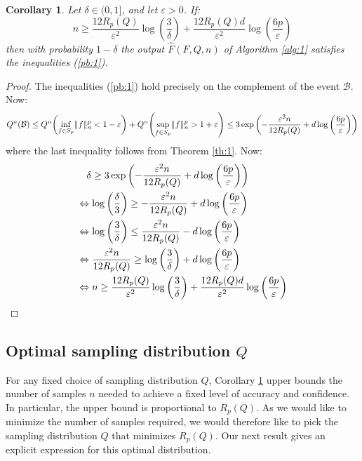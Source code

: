 \documentclass{article}
\theoremstyle{plain}
\newtheorem{corollary}[lemma]{Corollary}
\theoremstyle{definition}
\theoremstyle{remark}
\DeclarePairedDelimiter{\paren}{\lparen}{\rparen}
\newcommand{\eps}{\varepsilon}
\newcommand{\logp}[1]{\log{\left(#1\right)}}
\DeclarePairedDelimiter{\norm}{\lVert}{\rVert}
\begin{document}
\begin{corollary}
    \label{cor:1}
    Let $\delta \in (0,1]$, and let $\eps > 0$. If:
    \begin{equation*}
        n \geq \frac{12 R_p(Q)}{\eps^2}
        \logp{\frac{3}{\delta}} + \frac{12 R_p(Q) d}{\eps^2} \logp{\frac{6p}{\eps}}
    \end{equation*}
    then with probability $1-\delta$ the output $\widehat{F}(F, Q, n)$ of Algorithm \ref{alg:1} satisfies the inequalities (\ref{pb:1}).
\end{corollary}

\begin{proof}
    The inequalities (\ref{pb:1}) hold precisely on the complement of the event $\mathcal{B}$. Now:
    \begin{equation*}
       Q^{n}(\mathcal{B}) \leq Q^{n}\paren*{\inf_{f \in S_p} \norm{f}_{n}^p < 1 - \eps} + Q^{n}\paren*{\sup_{f \in S_p} \norm{f}_n^p > 1 + \eps} \\
       \leq 3 \exp{\paren*{-\frac{\eps^2n}{12 R_p(Q)} + d \logp{\frac{6p}{\eps}}}}
    \end{equation*}
    where the last inequality follows from Theorem \ref{th:1}. Now:
    \begin{align*}
        &\quad \delta \geq 3 \exp{\paren*{-\frac{\eps^2n}{12 R_p(Q)} + d \logp{\frac{6p}{\eps}}}} \\
        &\Leftrightarrow \logp{\frac{\delta}{3}} \geq -\frac{\eps^2n}{12R_p(Q)} + d\logp{\frac{6p}{\eps}} \\
        &\Leftrightarrow \logp{\frac{3}{\delta}} \leq \frac{\eps^2n}{12R_p(Q)} - d\logp{\frac{6p}{\eps}} \\
        &\Leftrightarrow \frac{\eps^2n}{12 R_p(Q)} \geq \logp{\frac{3}{\delta}} + d \logp{\frac{6p}{\eps}} \\
        &\Leftrightarrow n \geq \frac{12 R_p(Q)}{\eps^2}
        \logp{\frac{3}{\delta}} + \frac{12 R_p(Q) d}{\eps^2} \logp{\frac{6p}{\eps}}
    \end{align*}
\end{proof}

\subsection{Optimal sampling distribution $Q$}
For any fixed choice of sampling distribution $Q$, Corollary \ref{cor:1} upper bounds the number of samples $n$ needed to achieve a fixed level of accuracy and confidence. In particular, the upper bound is proportional to $R_p(Q)$. As we would like to minimize the number of samples required, we would therefore like to pick the sampling distribution $Q$ that minimizes $R_p(Q)$. Our next result gives an explicit expression for this optimal distribution.
\end{document}

